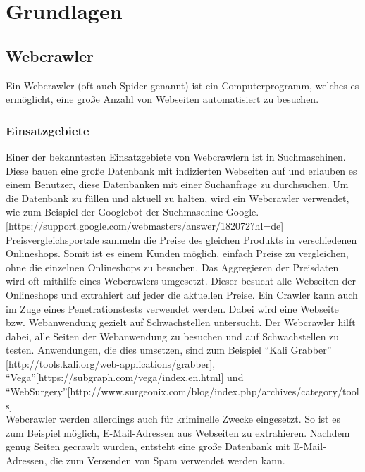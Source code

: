 \chapter{Grundlagen}
\section{Webcrawler}
Ein Webcrawler (oft auch Spider genannt) ist ein Computerprogramm, welches es ermöglicht, eine große Anzahl von Webseiten automatisiert zu besuchen.
\subsection{Einsatzgebiete}
Einer der bekanntesten Einsatzgebiete von Webcrawlern ist in Suchmaschinen. Diese bauen eine große Datenbank mit indizierten Webseiten auf und erlauben es einem Benutzer, diese Datenbanken mit einer Suchanfrage zu durchsuchen. Um die Datenbank zu füllen und aktuell zu halten, wird ein Webcrawler verwendet, wie zum Beispiel der Googlebot der Suchmaschine Google.  [https://support.google.com/webmasters/answer/182072?hl=de] \\
Preisvergleichsportale sammeln die Preise des gleichen Produkts in verschiedenen Onlineshops. Somit ist es einem Kunden möglich, einfach Preise zu vergleichen, ohne die einzelnen Onlineshops zu besuchen. Das Aggregieren der Preisdaten wird oft mithilfe eines Webcrawlers umgesetzt. Dieser besucht alle Webseiten der Onlineshops und extrahiert auf jeder die aktuellen Preise. 
Ein Crawler kann auch im Zuge eines Penetrationstests verwendet werden. Dabei wird eine Webseite bzw. Webanwendung gezielt auf Schwachstellen untersucht. Der Webcrawler hilft dabei, alle Seiten der Webanwendung zu besuchen und auf Schwachstellen zu testen. Anwendungen, die dies umsetzen, sind zum Beispiel \enquote{Kali Grabber} [http://tools.kali.org/web-applications/grabber], \enquote{Vega}[https://subgraph.com/vega/index.en.html] und \enquote{WebSurgery}[http://www.surgeonix.com/blog/index.php/archives/category/tools] \\
Webcrawler werden allerdings auch für kriminelle Zwecke eingesetzt. So ist es zum Beispiel möglich, E-Mail-Adressen aus Webseiten zu extrahieren. Nachdem genug Seiten gecrawlt wurden, entsteht eine große Datenbank mit E-Mail-Adressen, die zum Versenden von Spam verwendet werden kann. \\
